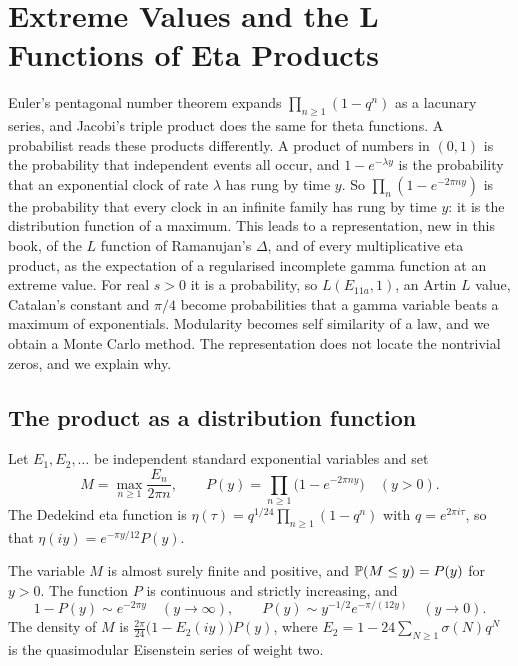\chapter{Extreme Values and the L Functions of Eta Products}\label{ch:11}

Euler's pentagonal number theorem expands $\prod_{n\ge1}(1-q^n)$ as a lacunary series, and Jacobi's triple product does the same for theta functions. A probabilist reads these products differently. A product of numbers in $(0,1)$ is the probability that independent events all occur, and $1-e^{-\lambda y}$ is the probability that an exponential clock of rate $\lambda$ has rung by time $y$. So $\prod_n(1-e^{-2\pi ny})$ is the probability that every clock in an infinite family has rung by time $y$: it is the distribution function of a maximum. This leads to a representation, new in this book, of the $L$ function of Ramanujan's $\Delta$, and of every multiplicative eta product, as the expectation of a regularised incomplete gamma function at an extreme value. For real $s>0$ it is a probability, so $L(E_{11a},1)$, an Artin $L$ value, Catalan's constant and $\pi/4$ become probabilities that a gamma variable beats a maximum of exponentials. Modularity becomes self similarity of a law, and we obtain a Monte Carlo method. The representation does not locate the nontrivial zeros, and we explain why.

\section{The product as a distribution function}

Let $E_1,E_2,\ldots$ be independent standard exponential variables and set
\[
M=\max_{n\ge1}\frac{E_n}{2\pi n},\qquad P(y)=\prod_{n\ge1}\bigl(1-e^{-2\pi ny}\bigr)\quad(y>0).
\]
The Dedekind eta function is $\eta(\tau)=q^{1/24}\prod_{n\ge1}(1-q^n)$ with $q=e^{2\pi i\tau}$, so that $\eta(iy)=e^{-\pi y/12}P(y)$.

\begin{proposition}\label{prop:ch11M}
The variable $M$ is almost surely finite and positive, and $\mathbb{P}(M\le y)=P(y)$ for $y>0$. The function $P$ is continuous and strictly increasing, and
\[
1-P(y)\sim e^{-2\pi y}\quad(y\to\infty),\qquad P(y)\sim y^{-1/2}e^{-\pi/(12y)}\quad(y\to0).
\]
The density of $M$ is $\tfrac{2\pi}{24}\bigl(1-E_2(iy)\bigr)P(y)$, where $E_2=1-24\sum_{N\ge1}\sigma(N)q^N$ is the quasimodular Eisenstein series of weight two.
\end{proposition}

